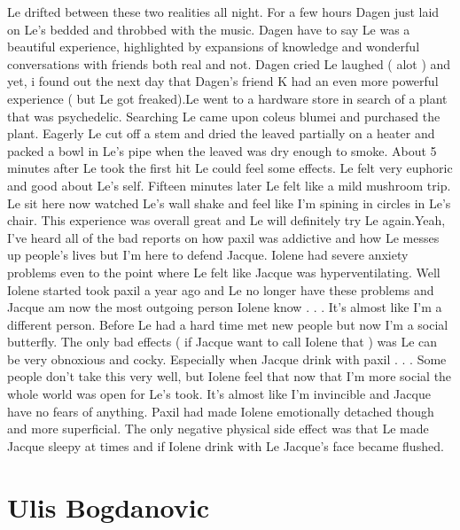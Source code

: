 \documentclass[12pt]{book}
\begin{document}
Le drifted between these two realities all night. For a few hours Dagen just laid on Le's bedded and throbbed with the music. Dagen have to say Le was a beautiful experience, highlighted by expansions of knowledge and wonderful conversations with friends both real and not. Dagen cried Le laughed ( alot ) and yet, i found out the next day that Dagen's friend K had an even more powerful experience ( but Le got freaked).Le went to a hardware store in search of a plant that was psychedelic. Searching Le came upon coleus blumei and purchased the plant. Eagerly Le cut off a stem and dried the leaved partially on a heater and packed a bowl in Le's pipe when the leaved was dry enough to smoke. About 5 minutes after Le took the first hit Le could feel some effects. Le felt very euphoric and good about Le's self. Fifteen minutes later Le felt like a mild mushroom trip. Le sit here now watched Le's wall shake and feel like I'm spining in circles in Le's chair. This experience was overall great and Le will definitely try Le again.Yeah, I've heard all of the bad reports on how paxil was addictive and how Le messes up people's lives but I'm here to defend Jacque. Iolene had severe anxiety problems even to the point where Le felt like Jacque was hyperventilating. Well Iolene started took paxil a year ago and Le no longer have these problems and Jacque am now the most outgoing person Iolene know . . .  It's almost like I'm a different person. Before Le had a hard time met new people but now I'm a social butterfly. The only bad effects ( if Jacque want to call Iolene that ) was Le can be very obnoxious and cocky. Especially when Jacque drink with paxil . . .  Some people don't take this very well, but Iolene feel that now that I'm more social the whole world was open for Le's took. It's almost like I'm invincible and Jacque have no fears of anything. Paxil had made Iolene emotionally detached though and more superficial. The only negative physical side effect was that Le made Jacque sleepy at times and if Iolene drink with Le Jacque's face became flushed.



\chapter{Ulis Bogdanovic}
\end{document}
